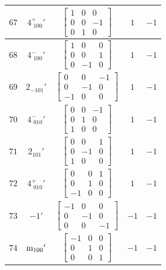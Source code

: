 \documentclass[fleqn,8pt]{jsarticle}
\begin{document}
\begin{longtable}{ccccc}
$ 67 $ & $ 4^{+}_{\,\,100}{}' $ & $ \begin{bmatrix} 1 & 0 & 0 \\ 0 & 0 & -1 \\ 0 & 1 & 0 \end{bmatrix} $ & $ 1 $ & $ -1 $ \\ \hline
$ 68 $ & $ 4^{-}_{\,\,100}{}' $ & $ \begin{bmatrix} 1 & 0 & 0 \\ 0 & 0 & 1 \\ 0 & -1 & 0 \end{bmatrix} $ & $ 1 $ & $ -1 $ \\ \hline
$ 69 $ & $ 2{}_{-101}{}' $ & $ \begin{bmatrix} 0 & 0 & -1 \\ 0 & -1 & 0 \\ -1 & 0 & 0 \end{bmatrix} $ & $ 1 $ & $ -1 $ \\ \hline
$ 70 $ & $ 4^{-}_{\,\,010}{}' $ & $ \begin{bmatrix} 0 & 0 & -1 \\ 0 & 1 & 0 \\ 1 & 0 & 0 \end{bmatrix} $ & $ 1 $ & $ -1 $ \\ \hline
$ 71 $ & $ 2{}_{101}{}' $ & $ \begin{bmatrix} 0 & 0 & 1 \\ 0 & -1 & 0 \\ 1 & 0 & 0 \end{bmatrix} $ & $ 1 $ & $ -1 $ \\ \hline
$ 72 $ & $ 4^{+}_{\,\,010}{}' $ & $ \begin{bmatrix} 0 & 0 & 1 \\ 0 & 1 & 0 \\ -1 & 0 & 0 \end{bmatrix} $ & $ 1 $ & $ -1 $ \\ \hline
$ 73 $ & $ -1{}' $ & $ \begin{bmatrix} -1 & 0 & 0 \\ 0 & -1 & 0 \\ 0 & 0 & -1 \end{bmatrix} $ & $ -1 $ & $ -1 $ \\ \hline
$ 74 $ & $ {\rm m}_{100}{}' $ & $ \begin{bmatrix} -1 & 0 & 0 \\ 0 & 1 & 0 \\ 0 & 0 & 1 \end{bmatrix} $ & $ -1 $ & $ -1 $ \\ \hline

\end{longtable}
\end{document}
